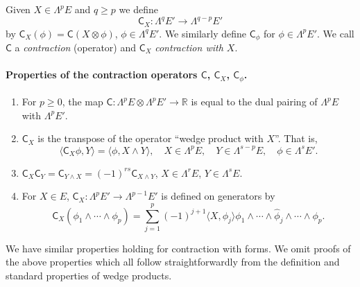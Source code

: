 Given $X\in\Lambda^p E$ and $q\geq p$ we define
\[
\mathsf C_X:\Lambda^q E'\to\Lambda^{q-p}E'
\]
by $\mathsf C_X(\phi)=\mathsf C(X\otimes\phi)$, $\phi\in\Lambda^q E'$. We similarly define $\mathsf C_\phi$ for $\phi\in\Lambda^p E'$. We call $\mathsf C$ a \emph{contraction} (operator) and $\mathsf C_X$ \emph{contraction with $X$}.

\paragraph{Properties of the contraction operators $\mathsf C$, $\mathsf C_X$, $\mathsf C_\phi$.}
\begin{enumerate}
\item For $p\geq0$, the map $\mathsf C:\Lambda^p E\otimes\Lambda^p E'\to\mathbb R$ is equal to the dual pairing of $\Lambda^p E$ with $\Lambda^p E'$.
\item $\mathsf C_X$ is the transpose of the operator ``wedge product with $X$''. That is,
\[
\langle\mathsf C_X\phi,Y\rangle=\langle\phi,X\wedge Y\rangle,\quad X\in\Lambda^p E,\quad Y\in\Lambda^{s-p}E,\quad\phi\in\Lambda^s E'.
\]
\item $\mathsf C_X\mathsf C_Y=\mathsf C_{Y\wedge X}=(-1)^{rs}\mathsf C_{X\wedge Y}$, $X\in\Lambda^r E$, $Y\in\Lambda^s E$.
\item For $X\in E$, $\mathsf C_X:\Lambda^p E'\to\Lambda^{p-1}E'$ is defined on generators by
\[
\mathsf C_X(\phi_1\wedge\cdots\wedge\phi_p)=\sum_{j=1}^p(-1)^{j+1}\langle X,\phi_j\rangle\phi_1\wedge\cdots\wedge\widehat\phi_j\wedge\cdots\wedge\phi_p.
\]
\end{enumerate}
We have similar properties holding for contraction with forms. We omit proofs of the above properties which all follow straightforwardly from the definition and standard properties of wedge products.

